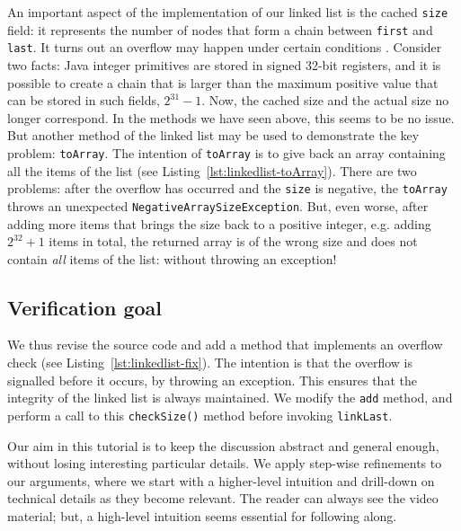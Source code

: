 \documentclass[runningheads]{llncs}
\theoremstyle{remark}
\begin{document}
An important aspect of the implementation of our linked list is the cached \texttt{size} field: it represents the number of nodes that form a chain between \texttt{first} and \texttt{last}. It turns out an overflow may happen under certain conditions . Consider two facts: Java integer primitives are stored in signed 32-bit registers, and it is possible to create a chain that is larger than the maximum positive value that can be stored in such fields, $2^{31}-1$. Now, the cached size and the actual size no longer correspond. In the methods we have seen above, this seems to be no issue. But another method of the linked list may be used to demonstrate the key problem: \texttt{toArray}. The intention of \texttt{toArray} is to give back an array containing all the items of the list (see Listing~\ref{lst:linkedlist-toArray}). There are two problems: after the overflow has occurred and the \texttt{size} is negative, the \texttt{toArray} throws an unexpected \texttt{NegativeArraySizeException}. But, even worse, after adding more items that brings the size back to a positive integer, e.g. adding $2^{32}+1$ items in total, the returned array is of the wrong size and does not contain \emph{all} items of the list: without throwing an exception!



\subsection{Verification goal}

We thus revise the source code and add a method that implements an overflow check (see Listing~\ref{lst:linkedlist-fix}). The intention is that the overflow is signalled before it occurs, by throwing an exception. This ensures that the integrity of the linked list is always maintained. We modify the \texttt{add} method, and perform a call to this \texttt{checkSize()} method before invoking \texttt{linkLast}.



Our aim in this tutorial is to keep the discussion abstract and general enough, without losing interesting particular details. We apply step-wise refinements to our arguments, where we start with a higher-level intuition and drill-down on technical details as they become relevant. The reader can always see the video material; but, a high-level intuition seems essential for following along.
\end{document}
